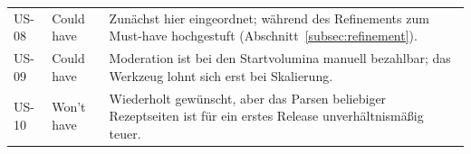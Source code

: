 \begin{table}[H]
\begin{tabular}{@{}p{1.2cm}p{2.6cm}p{10.5cm}@{}}
    US-08 & Could have  & Zunächst hier eingeordnet; während des Refinements zum
                          Must-have hochgestuft
                          (Abschnitt~\ref{subsec:refinement}). \\
    US-09 & Could have  & Moderation ist bei den Startvolumina manuell
                          bezahlbar; das Werkzeug lohnt sich erst bei Skalierung. \\
    US-10 & Won't have  & Wiederholt gewünscht, aber das Parsen beliebiger
                          Rezeptseiten ist für ein erstes Release
                          unverhältnismäßig teuer. \\
    \bottomrule
  \end{tabular}
\end{table}

%
%
%
